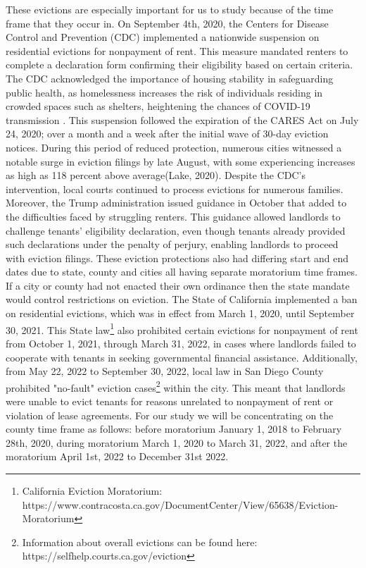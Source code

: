 \documentclass[man, 12pt, donotrepeattitle, floatsintext]{apa7} %
\begin{document}
These evictions are especially important for us to study because of the time frame that they occur in. On September 4th, 2020, the Centers for Disease Control and Prevention (CDC) implemented a nationwide suspension on residential evictions for nonpayment of rent. This measure mandated renters to complete a declaration form confirming their eligibility based on certain criteria. The CDC acknowledged the importance of housing stability in safeguarding public health, as homelessness increases the risk of individuals residing in crowded spaces such as shelters, heightening the chances of COVID-19 transmission \parencite{Lake2022}. This suspension followed the expiration of the CARES Act on July 24, 2020; over a month and a week after the initial wave of 30-day eviction notices. During this period of reduced protection, numerous cities witnessed a notable surge in eviction filings by late August, with some experiencing increases as high as 118 percent above average(Lake, 2020). Despite the CDC's intervention, local courts continued to process evictions for numerous families. Moreover, the Trump administration issued guidance in October that added to the difficulties faced by struggling renters. This guidance allowed landlords to challenge tenants' eligibility declaration, even though tenants already provided such declarations under the penalty of perjury, enabling landlords to proceed with eviction filings. These eviction protections also had differing start and end dates due to state, county and cities all having separate moratorium time frames. If a city or county had not enacted their own ordinance then the state mandate would control restrictions on eviction. The State of California implemented a ban on residential evictions, which was in effect from March 1, 2020, until September 30, 2021. This State law\footnote{California Eviction Moratorium: https://www.contracosta.ca.gov/DocumentCenter/View/65638/Eviction-Moratorium} also prohibited certain evictions for nonpayment of rent from October 1, 2021, through March 31, 2022, in cases where landlords failed to cooperate with tenants in seeking governmental financial assistance. Additionally, from May 22, 2022 to September 30, 2022, local law in San Diego County prohibited "no-fault" eviction cases\footnote{Information about overall evictions can be found here: https://selfhelp.courts.ca.gov/eviction} within the city. This meant that landlords were unable to evict tenants for reasons unrelated to nonpayment of rent or violation of lease agreements. For our study we will be concentrating on the county time frame as follows: before moratorium January 1, 2018 to February 28th, 2020, during moratorium March 1, 2020 to March 31, 2022, and after the moratorium April 1st, 2022 to December 31st 2022.
\end{document}
